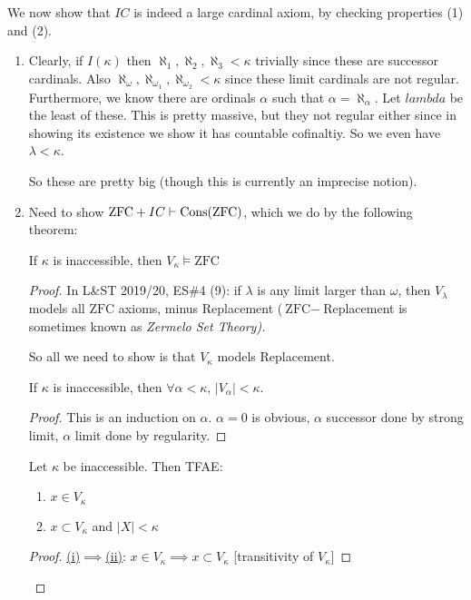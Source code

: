 \documentclass[]{article}
\newcommand{\om}{\omega}
\newcommand{\zfc}{\textrm{ZFC}}
\newcommand{\cons}{\textrm{Cons}}
\begin{document}
We now show that $IC$ is indeed a large cardinal axiom, by checking properties (1) and (2).
\begin{enumerate}[label = (\roman*)]
    \item Clearly, if $I(\kappa)$ then $\aleph_1,\aleph_2,\aleph_3 < \kappa $ trivially since these are successor cardinals. Also $\aleph_{\omega},\aleph_{\om_1},\aleph_{\om_2} < \kappa$ since these limit cardinals are not regular. Furthermore, we know there are ordinals $\alpha$ such that $\alpha = \aleph_\alpha$. Let $lambda$ be the least of these. This is pretty massive, but they not regular either since in showing its existence we show it has countable cofinaltiy. So we even have $\lambda < \kappa$.
    
    So these are pretty big (though this is currently an imprecise notion).

    \item Need to show $\zfc + IC \proves \cons(\zfc)$, which we do by the following theorem:
    
    \begin{theorem*}
        If $\kappa$ is inaccessible, then $V_\kappa \models \zfc$
    \end{theorem*}
    \begin{proof}
        In L\&ST 2019/20, ES\#4 (9): if $\lambda$ is any limit larger than $\omega$, then $V_\lambda$ models all $\zfc$ axioms, minus Replacement ($\zfc - $Replacement is sometimes known as \it{Zermelo Set Theory}).

        So all we need to show is that $V_\kappa$ models Replacement.

        \begin{remark*}[Lemma 1]
            If $\kappa$ is inaccessible, then $\forall \alpha < \kappa$, $|V_\alpha| < \kappa$.
        \end{remark*}
        \begin{proof}
            This is an induction on $\alpha$. $\alpha = 0$ is obvious, $\alpha$ successor done by strong limit, $\alpha$ limit done by regularity.
        \end{proof}

        \begin{remark*}[Lemma 2]
            Let $\kappa$ be inaccessible. Then TFAE:
            \begin{enumerate}[label=(\roman*)]
                \item $x \in V_\kappa$
                \item $x\subset V_\kappa$ and $|X| < \kappa$
            \end{enumerate}
        \end{remark*}
        \begin{proof} \underline{(i)$\implies$(ii)}:
            $x \in V_\kappa \implies x\subset V_\kappa$ [transitivity of $V_\kappa$]
            

\end{proof}
\end{proof}
\end{enumerate}
\end{document}
